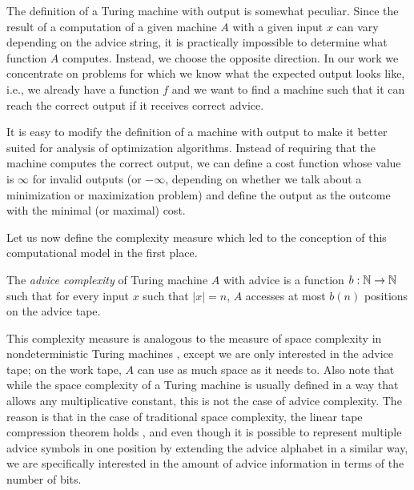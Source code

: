 The definition of a Turing machine with output is somewhat peculiar. Since
the result of a computation of a given machine $A$ with a given input $x$
can vary depending on the advice string, it is practically impossible to
determine what function $A$ computes. Instead, we choose the opposite
direction. In our work we concentrate on problems for which we know what
the expected output looks like, i.e., we already have a function $f$ and
we want to find a machine such that it can reach the correct output if it
receives correct advice.

It is easy to modify the definition of a machine with output to make it
better suited for analysis of optimization algorithms. Instead of
requiring that the machine computes the correct output, we can define a
cost function whose value is $\infty$ for invalid outputs (or $-\infty$,
depending on whether we talk about a minimization or maximization problem)
and define the output as the outcome with the minimal (or maximal) cost.

Let us now define the complexity measure which led to the conception of
this computational model in the first place.

\begin{definition}\label{definition:offline-advice-complexity}
    The \emph{advice complexity} of Turing machine $A$ with advice is a
    function $b: \mathbb{N} \to \mathbb{N}$ such that for every input $x$ such that $|x| =
    n$, $A$ accesses at most $b(n)$ positions on the advice tape.
\end{definition}

This complexity measure is analogous to the measure of space complexity in
nondeterministic Turing machines \cite{nspace}, except we are only
interested in the advice tape; on the work tape, $A$ can use as much space
as it needs to. Also note that while the space complexity of a Turing
machine is usually defined in a way that allows any multiplicative
constant, this is not the case of advice complexity. The reason is that
in the case of traditional space complexity, the linear tape compression
theorem holds \cite{tape-compression}, and even though it is possible to
represent multiple advice symbols in one position by extending the advice
alphabet in a similar way, we are specifically interested in the amount of
advice information in terms of the number of bits.
